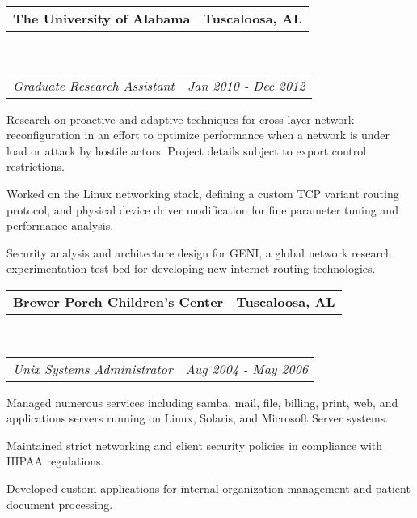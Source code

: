 \documentclass[10pt,letterpaper]{article}
\makeatletter
\newcommand{\headerrow}[2]
{\begin{tabular*}{\linewidth}{l@{\extracolsep{\fill}}r}
	#1 &
	#2 \\
\end{tabular*}}
\newcommand{\employment}[5]{
	\headerrow
		{\textbf{#1}}
		{\textbf{#2}}
	\\
	\headerrow
		{\emph{#3}}
		{\emph{#4}}
	\begin{itemize*}
		\item #5
	\end{itemize*}
}
\makeatother
\begin{document}
\employment{The University of Alabama}{Tuscaloosa, AL}{Graduate Research Assistant}{Jan 2010 - Dec 2012}{
Research on proactive and adaptive techniques for cross-layer network
reconfiguration in an effort to optimize performance when a network
is under load or attack by hostile actors. Project details subject to export control restrictions.
\item Worked on the Linux networking stack, defining a custom TCP variant
  routing protocol, and physical device driver modification for fine parameter tuning and performance analysis.
\item Security analysis and architecture design for GENI, a global network
  research experimentation test-bed for developing new internet routing technologies.
}

\employment{Brewer Porch Children's Center}{Tuscaloosa, AL}{Unix Systems
  Administrator}{Aug 2004 - May 2006}{
Managed numerous services including samba, mail, file, billing, print, web, and applications servers running on Linux, Solaris, and Microsoft Server systems.
\item Maintained strict networking and client security policies in compliance with HIPAA regulations.
\item Developed custom applications for internal organization management and patient document processing.
}

\vspace*{3pt}
\end{document}

